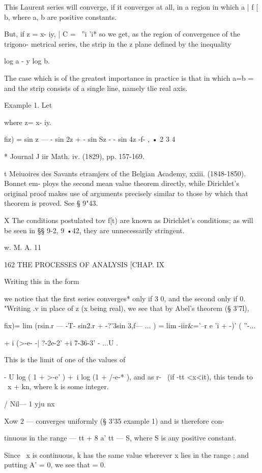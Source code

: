 This Laurent series will converge, if it converges at all, in a region
in which a | f [ b, where a, b are positive constants.

But, if z = x- iy, | C = ~''i 'i* so we get, as the region of
convergence of the trigono- metrical series, the strip in the z plane
defined by the inequality

log a - y log b.

The case which is of the greatest importance in practice is that in
which a=b = \, and the strip consists of a single line, namely tlie
real axis.

Example 1. Let

where z= x- iy.

fiz) = sin z — - sin 2z + - sin Sz - - sin 4z -f- , • 2 3 4

* Journal J iir Math. iv. (1829), pp. 157-169.

t Meiuoires des Savants etramjers of the Belgian Academy, xxiii.
(1848-1850). Bonnet em- ploys the second mean value theorem directly,
while Dirichlet's original proof makes use of arguments precisely
similar to those by which that theorem is proved. See § 9"43.

X The conditions postulated tov f[t) are known as Dirichlet's
conditions; as will be seen in §§ 9-2, 9 •42, they are unnecessarily
stringent.

w. M. A. 11

162 THE PROCESSES OF ANALYSIS [CHAP. IX

Writing this in the form

we notice that the first series converges* only if 3 0, and the second
only if 0. "Writing .v in place of z (x being real), we see that by
Abel's theorem (§ 3'7l),

fix)= lim (rsin.r — -T- sin2.r + -?'3sin 3,f— ... ) = lim -iir\&='--r
e 'i + -)' ( ''-...\

+ i (>-e- -| ?-2e-2' +i 7-36-3' - ...U .

This is the limit of one of the values of

- U log ( 1 + >-e' ) +\ i log (1 + /-e-* ), and as r- \ (if -tt
<x<it), this tends to \ x + kn, where k is some integer.

  / Nil— 1 yju nx

Xow 2 — converges uniformly (§ 3'35 example 1) and is therefore con-

tinuous in the range — tt + 8 a' tt — S, where S is any positive
constant.

Since \ x is continuous, k has the same value wherever x lies in the
range ; and putting A' = 0, we see that = 0.

